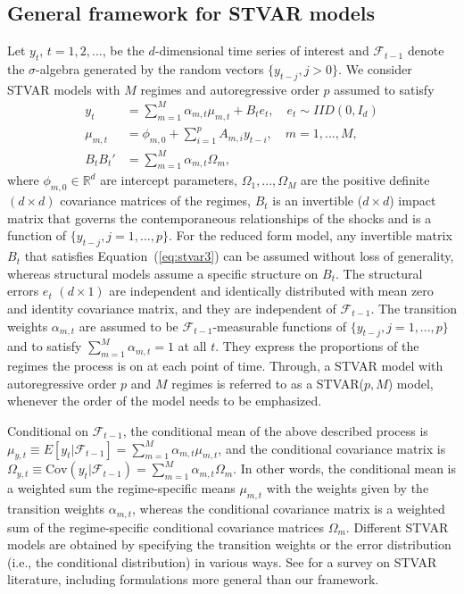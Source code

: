 \documentclass[nojss]{jss}
\begin{document}
\subsection{General framework for STVAR models}\label{sec:genstvar}
Let $y_t$, $t=1,2,...$, be the $d$-dimensional time series of interest and $\mathcal{F}_{t-1}$ denote the $\sigma$-algebra generated by the random vectors $\lbrace y_{t-j}, j>0 \rbrace$. We consider STVAR models with $M$ regimes and autoregressive order $p$ assumed to satisfy
\begin{align}
y_t &=\sum_{m=1}^M \alpha_{m,t}\mu_{m,t} + B_te_t, \quad e_{t} \sim IID(0, I_d)\label{eq:stvar1} \\
\mu_{m,t} &= \phi_{m,0} + \sum_{i=1}^{p}A_{m,i}y_{t-i}, \quad m=1,...,M,\label{eq:stvar2}\\
B_tB_t' &= \sum_{m=1}^M \alpha_{m,t}\Omega_m, \label{eq:stvar3}
\end{align}
where $\phi_{m,0}\in\mathbb{R}^{d}$ are intercept parameters, $\Omega_1,...,\Omega_M$ are the positive definite $(d\times d)$ covariance matrices of the regimes, $B_t$ is an invertible ($d\times d$) impact matrix that governs the contemporaneous relationships of the shocks and is a function of $\lbrace y_{t-j}, j=1,...,p \rbrace$. For the reduced form model, any invertible matrix $B_t$ that satisfies Equation~(\ref{eq:stvar3}) can be assumed without loss of generality, whereas structural models assume a specific structure on $B_t$. The structural errors $e_{t}$ $(d\times 1)$ are independent and identically distributed with mean zero and identity covariance matrix, and they are independent of $\mathcal{F}_{t-1}$. The transition weights $\alpha_{m,t}$ are assumed to be $\mathcal{F}_{t-1}$-measurable functions of $\lbrace y_{t-j}, j=1,...,p \rbrace$ and to satisfy $\sum_{m=1}^{M}\alpha_{m,t}=1$ at all $t$. They express the proportions of the regimes the process is on at each point of time. Through, a STVAR model with autoregressive order $p$ and $M$ regimes is referred to as a STVAR($p,M$) model, whenever the order of the model needs to be emphasized.

Conditional on $\mathcal{F}_{t-1}$, the conditional mean of the above described process is $\mu_{y,t} \equiv E[y_t|\mathcal{F}_{t-1}] = \sum_{m=1}^M \alpha_{m,t}\mu_{m,t}$, and the conditional covariance matrix is $\Omega_{y,t}\equiv \text{Cov}(y_t|\mathcal{F}_{t-1}) = \sum_{m=1}^M \alpha_{m,t}\Omega_m$. In other words, the conditional mean is a weighted sum the regime-specific means $\mu_{m,t}$ with the weights given by the transition weights $\alpha_{m,t}$, whereas the conditional covariance matrix is a weighted sum of the regime-specific conditional covariance matrices $\Omega_m$. Different STVAR models are obtained by specifying the transition weights or the error distribution (i.e., the conditional distribution) in various ways. See \cite{Hubrich+Terasvirta:2013} for a survey on STVAR literature, including formulations more general than our framework.
\end{document}

